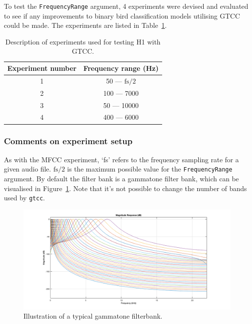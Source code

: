 To test the \texttt{FrequencyRange} argument, 4 experiments were devised and
evaluated to see if any improvements to binary bird classification
models utilising GTCC could be made. The experiments are listed in
Table~\ref{table:h1_gtcc_experiments}.

\begin{table}[ht]
\begin{center}
\begin{tabular}{c c}
\toprule
Experiment number & Frequency range (Hz) \\ [0.5ex]
\midrule
1 & 50 --- $\text{fs}/2$ \\
2 & 100 --- 7000 \\
3 & 50 --- 10000 \\
4 & 400 --- 6000 \\
\bottomrule
\end{tabular}
\caption{Description of experiments used for testing H1 with
GTCC.}\label{table:h1_gtcc_experiments}
\end{center}
\end{table}

\subsubsection{Comments on experiment setup}

As with the MFCC experiment, `fs' refers to the frequency sampling rate for a
given audio file. $\text{fs}/2$ is the maximum possible value for the
\texttt{FrequencyRange} argument. By default the filter bank is a gammatone
filter bank, which can be visualised in Figure~\ref{fig:gammatone_filterbank}.
Note that it's not possible to change the number of bands used by \texttt{gtcc}.

\begin{figure}[ht]
  \centering
  \includegraphics[width=\textwidth]{figures/gammatone_filterbank.png}
  \caption{Illustration of a typical gammatone
  filterbank.}\label{fig:gammatone_filterbank}
\end{figure}

